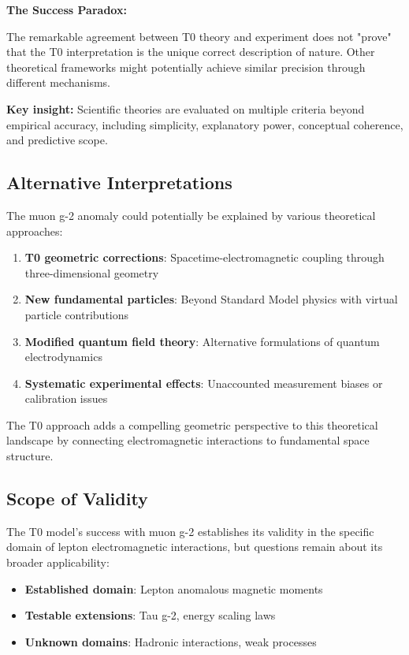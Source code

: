 \documentclass[12pt,a4paper]{report}
\begin{document}
	\begin{tcolorbox}[colback=yellow!5!white,colframe=orange!75!black,title=Theoretical Humility]
		\textbf{The Success Paradox:}
		
		The remarkable agreement between T0 theory and experiment does not "prove" that the T0 interpretation is the unique correct description of nature. Other theoretical frameworks might potentially achieve similar precision through different mechanisms.
		
		\textbf{Key insight:} Scientific theories are evaluated on multiple criteria beyond empirical accuracy, including simplicity, explanatory power, conceptual coherence, and predictive scope.
	\end{tcolorbox}
	
	\subsection{Alternative Interpretations}
	\label{subsec:alternative_interpretations}
	
	The muon g-2 anomaly could potentially be explained by various theoretical approaches:
	\begin{enumerate}
		\item \textbf{T0 geometric corrections}: Spacetime-electromagnetic coupling through three-dimensional geometry
		\item \textbf{New fundamental particles}: Beyond Standard Model physics with virtual particle contributions
		\item \textbf{Modified quantum field theory}: Alternative formulations of quantum electrodynamics
		\item \textbf{Systematic experimental effects}: Unaccounted measurement biases or calibration issues
	\end{enumerate}
	
	The T0 approach adds a compelling geometric perspective to this theoretical landscape by connecting electromagnetic interactions to fundamental space structure.
	
	\subsection{Scope of Validity}
	\label{subsec:scope_validity}
	
	The T0 model's success with muon g-2 establishes its validity in the specific domain of lepton electromagnetic interactions, but questions remain about its broader applicability:
	\begin{itemize}
		\item \textbf{Established domain}: Lepton anomalous magnetic moments
		\item \textbf{Testable extensions}: Tau g-2, energy scaling laws
		\item \textbf{Unknown domains}: Hadronic interactions, weak processes
	\end{itemize}
	
\end{document}
